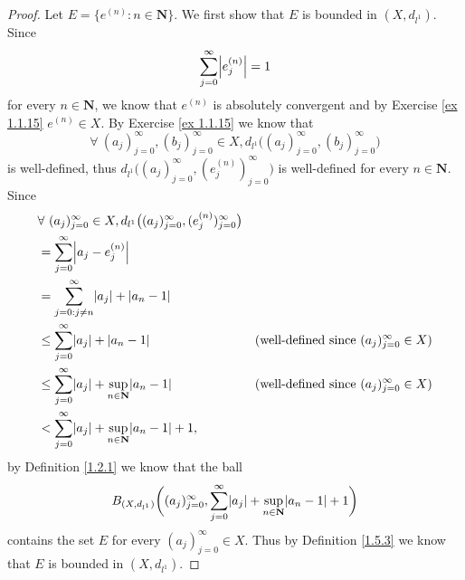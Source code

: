 \begin{proof}
    Let \(E = \{e^{(n)} : n \in \mathbf{N}\}\).
    We first show that \(E\) is bounded in \((X, d_{l^1})\).
    Since
    \[
        \sum_{j = 0}^\infty \abs*{e_j^{(n)}} = 1
    \]
    for every \(n \in \mathbf{N}\), we know that \(e^{(n)}\) is absolutely convergent and by Exercise \ref{ex 1.1.15} \(e^{(n)} \in X\).
    By Exercise \ref{ex 1.1.15} we know that
    \[
        \forall\ (a_j)_{j = 0}^\infty, (b_j)_{j = 0}^\infty \in X, d_{l^1}\big((a_j)_{j = 0}^\infty, (b_j)_{j = 0}^\infty\big)
    \]
    is well-defined, thus \(d_{l^1}\big((a_j)_{j = 0}^\infty, (e_j^{(n)})_{j = 0}^\infty\big)\) is well-defined for every \(n \in \mathbf{N}\).
    Since
    \begin{align*}
         & \forall\ (a_j)_{j = 0}^\infty \in X, d_{l^1}\big((a_j)_{j = 0}^\infty, (e_j^{(n)})_{j = 0}^\infty\big)                                                              \\
         & = \sum_{j = 0}^\infty \abs*{a_j - e_j^{(n)}}                                                                                                                        \\
         & = \sum_{j = 0 : j \neq n}^\infty \abs*{a_j} + \abs*{a_n - 1}                                                                                                        \\
         & \leq \sum_{j = 0}^\infty \abs*{a_j} + \abs*{a_n - 1}                                                   & \text{(well-defined since \((a_j)_{j = 0}^\infty \in X\))} \\
         & \leq \sum_{j = 0}^\infty \abs*{a_j} + \sup_{n \in \mathbf{N}}\abs*{a_n - 1}                            & \text{(well-defined since \((a_j)_{j = 0}^\infty \in X\))} \\
         & < \sum_{j = 0}^\infty \abs*{a_j} + \sup_{n \in \mathbf{N}}\abs*{a_n - 1} + 1,
    \end{align*}
    by Definition \ref{1.2.1} we know that the ball
    \[
        B_{(X, d_{l^1})}\bigg((a_j)_{j = 0}^\infty, \sum_{j = 0}^\infty \abs*{a_j} + \sup_{n \in \mathbf{N}}\abs*{a_n - 1} + 1\bigg)
    \]
    contains the set \(E\) for every \((a_j)_{j = 0}^\infty \in X\).
    Thus by Definition \ref{1.5.3} we know that \(E\) is bounded in \((X, d_{l^1})\).


\end{proof}
